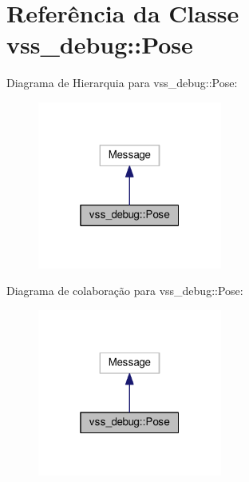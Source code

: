 \hypertarget{classvss__debug_1_1Pose}{}\section{Referência da Classe vss\+\_\+debug\+:\+:Pose}
\label{classvss__debug_1_1Pose}


Diagrama de Hierarquia para vss\+\_\+debug\+:\+:Pose\+:\nopagebreak
\begin{figure}[H]
\begin{center}
\leavevmode
\includegraphics[width=172pt]{classvss__debug_1_1Pose__inherit__graph}
\end{center}
\end{figure}


Diagrama de colaboração para vss\+\_\+debug\+:\+:Pose\+:\nopagebreak
\begin{figure}[H]
\begin{center}
\leavevmode
\includegraphics[width=172pt]{classvss__debug_1_1Pose__coll__graph}
\end{center}
\end{figure}
